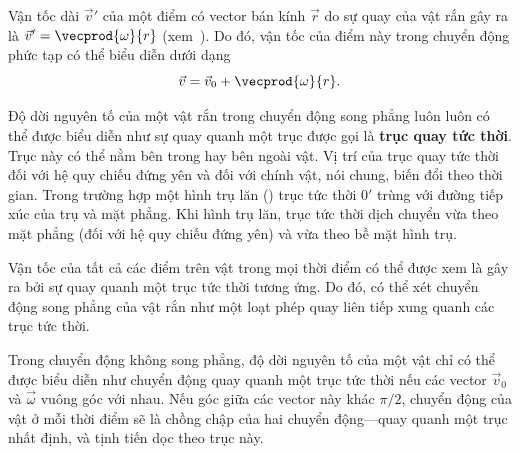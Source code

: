 Vận tốc dài $\vec{v}'$ của một điểm có vector bán kính $\vec{r}$ do sự quay của vật rắn gây ra là $\vec{v}'=\vecprod{\omega}{r}$ (xem~). Do đó, vận tốc của điểm này trong chuyển động phức tạp có thể biểu diễn dưới dạng
\begin{equation}\label{eq:5_1}
\vec{v} = \vec{v}_0 + \vecprod{\omega}{r}.
\end{equation}

Độ dời nguyên tố của một vật rắn trong chuyển động song phẳng luôn luôn có thể được biểu diễn như sự quay quanh một trục được gọi là \textbf{trục quay tức thời}. Trục này có thể nằm bên trong hay bên ngoài vật. Vị trí của trục quay tức thời đối với hệ quy chiếu đứng yên và đối với chính vật, nói chung, biến đổi theo thời gian. Trong trường hợp một hình trụ lăn () trục tức thời $0'$ trùng với đường tiếp xúc của trụ và mặt phẳng. Khi hình trụ lăn, trục tức thời dịch chuyển vừa theo mặt phẳng (đối với hệ quy chiếu đứng yên) và vừa theo bề mặt hình trụ.

Vận tốc của tất cả các điểm trên vật trong mọi thời điểm có thể được xem là gây ra bởi sự quay quanh một trục tức thời tương ứng. Do đó, có thể xét chuyển động song phẳng của vật rắn như một loạt phép quay liên tiếp xung quanh các trục tức thời.

Trong chuyển động không song phẳng, độ dời nguyên tố của một vật chỉ có thể được biểu diễn như chuyển động quay quanh một trục tức thời nếu các vector $\vec{v}_0$ và $\vec{\omega}$ vuông góc với nhau. Nếu góc giữa các vector này khác $\pi/2$, chuyển động của vật ở mỗi thời điểm sẽ là chồng chập của hai chuyển động---quay quanh một trục nhất định, và tịnh tiến dọc theo trục này.

